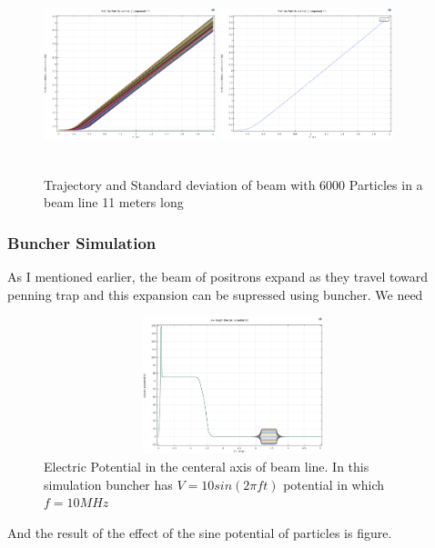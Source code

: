 \documentclass{article}
\begin{document}
\begin{figure}[h]
\centering
\includegraphics[width=50mm, height=50mm]{sim-in-100-11met}
\includegraphics[width=50mm, height=50mm]{sim-std-100-11met}
\caption{Trajectory and Standard deviation of beam with 6000 Particles in a beam line 11 meters long }
\end{figure}

\subsubsection{Buncher Simulation}
As I mentioned earlier, the beam of positrons expand as they travel toward penning trap and this expansion can be supressed using buncher. We need

\begin{figure}[h]
\centering
\includegraphics[width=110mm, height=40mm]{potential_buncher}
\caption{Electric Potential in the centeral axis of beam line. In this simulation buncher has $ V = 10 sin(2 \pi f t) $ potential in which $ f=10 MHz $}
\end{figure}

And the result of the effect of the sine potential of particles is figure.
\end{document}
